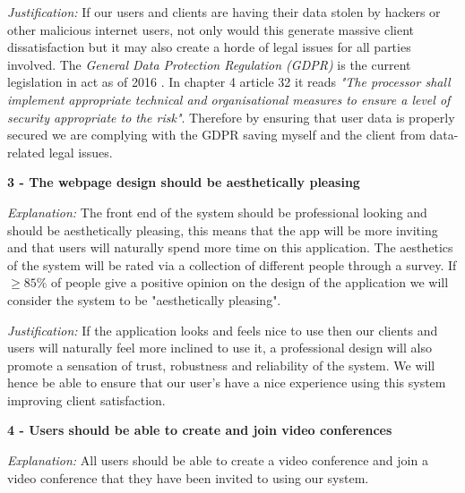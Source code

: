 \vspace{0.1cm}

\textit{Justification:}
If our users and clients are having their data stolen by
hackers or other malicious internet users, not only would this
generate massive client dissatisfaction but it may also create
a horde of legal issues for all parties involved. The
\textit{General Data Protection Regulation (GDPR)} is the
current legislation in act as of 2016 \cite{gdpr}. In chapter 4
article 32 it reads \textit{"The processor shall implement
appropriate technical and organisational measures to ensure
a level of security appropriate to the risk"}. Therefore by
ensuring that user data is properly secured we are complying
with the GDPR saving myself and the client from data-related
legal issues.

\vspace{0.2cm}

\textsf{\bfseries 3 - The webpage design should be aesthetically
pleasing}

\vspace{0.1cm}

\textit{Explanation:}
The front end of the system should be professional looking and
should be aesthetically pleasing, this means that the app
will be more inviting and that users will naturally spend more
time on this application. The aesthetics of the system will be
rated via a collection of different people through a survey.
If $\geq 85\%$ of people give a positive opinion on the
design of the application we will consider the system to be
"aesthetically pleasing".

\vspace{0.1cm}

\textit{Justification:}
If the application looks and feels nice to use then our
clients and users will naturally feel more inclined to use it,
a professional design will also promote a sensation of trust,
robustness and reliability of the system. We will hence be
able to ensure that our user's have a nice experience using
this system improving client satisfaction.

\vspace{0.2cm}

\textsf{\bfseries 4 - Users should be able to create and
join video conferences}

\vspace{0.1cm}

\textit{Explanation:}
All users should be able to create a video conference and
join a video conference that they have been invited to
using our system.

